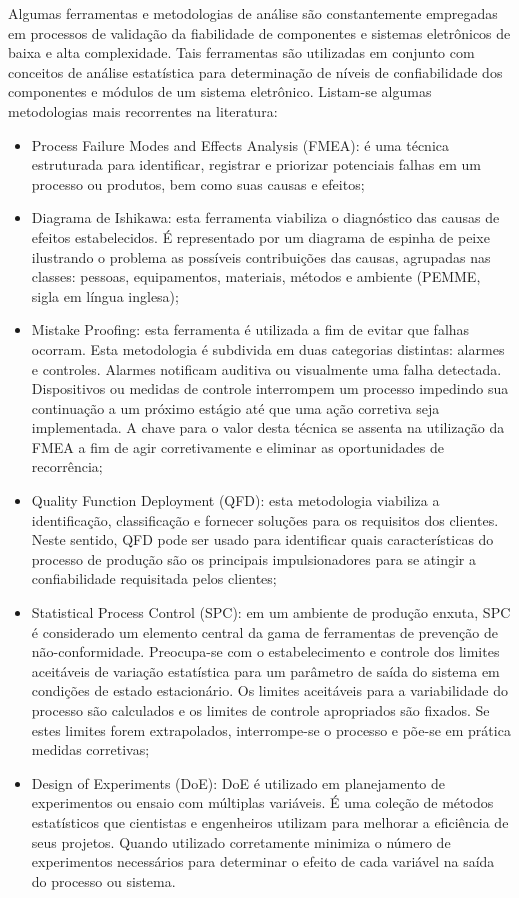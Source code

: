 \begin{anexosenv}
Algumas ferramentas e metodologias de análise são constantemente empregadas em processos de validação da fiabilidade de componentes e sistemas eletrônicos de baixa e alta complexidade. Tais ferramentas são utilizadas em conjunto com conceitos de análise estatística para determinação de níveis de confiabilidade dos componentes e módulos de um sistema eletrônico. Listam-se algumas metodologias mais recorrentes na literatura:

\begin{itemize}
\item Process Failure Modes and Effects Analysis (FMEA): é uma técnica estruturada para identificar, registrar e priorizar potenciais falhas em um processo ou produtos, bem como suas causas e efeitos;
\item Diagrama de Ishikawa: esta ferramenta viabiliza o diagnóstico das causas de efeitos estabelecidos. É representado por um diagrama de espinha de peixe ilustrando o problema as possíveis contribuições das causas, agrupadas nas classes: pessoas, equipamentos, materiais, métodos e ambiente (PEMME, sigla em língua inglesa);
\item Mistake Proofing: esta ferramenta é utilizada a fim de evitar que falhas ocorram. Esta metodologia é subdivida em duas categorias distintas: alarmes e controles. Alarmes notificam auditiva ou visualmente uma falha detectada. Dispositivos ou medidas de controle interrompem um processo impedindo sua continuação a um próximo estágio até que uma ação corretiva seja implementada. A chave para o valor desta técnica se assenta na utilização da FMEA a fim de agir corretivamente e eliminar as oportunidades de recorrência;
\item Quality Function Deployment (QFD): esta metodologia viabiliza a identificação, classificação e fornecer soluções para os requisitos dos clientes. Neste sentido, QFD pode ser usado para identificar quais características do processo de produção são os principais impulsionadores para se atingir a confiabilidade requisitada pelos clientes;
\item Statistical Process Control (SPC): em um ambiente de produção enxuta, SPC é considerado um elemento central da gama de ferramentas de prevenção de não-conformidade. Preocupa-se com o estabelecimento e controle dos limites aceitáveis de variação estatística para um parâmetro de saída do sistema em condições de estado estacionário. Os limites aceitáveis para a variabilidade do processo são calculados e os limites de controle apropriados são fixados. Se estes limites forem extrapolados, interrompe-se o processo e põe-se em prática medidas corretivas;
\item Design of Experiments (DoE): DoE é utilizado em planejamento de experimentos ou ensaio com múltiplas variáveis. É uma coleção de métodos estatísticos que cientistas e engenheiros utilizam para melhorar a eficiência de seus projetos. Quando utilizado corretamente minimiza o número de experimentos necessários para determinar o efeito de cada variável na saída do processo ou sistema. 
\end{itemize}


\end{anexosenv}
